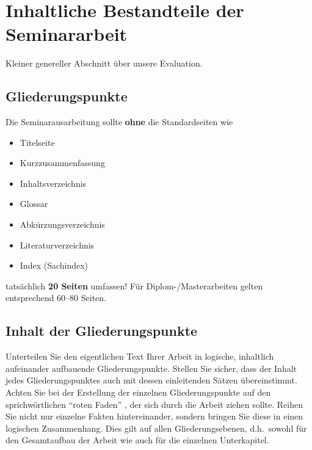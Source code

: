 %
\section{Inhaltliche Bestandteile der Seminararbeit}
\label{sec_inhalt}

Kleiner genereller Abschnitt über unsere Evaluation.




\subsection{Gliederungspunkte}

Die Seminarausarbeitung sollte {\bf ohne} die Standardseiten wie
\begin{itemize}
\item Titelseite
\item Kurzzusammenfassung
\item Inhaltsverzeichnis
\item Glossar
\item Abkürzungsverzeichnis
\item Literaturverzeichnis
\item Index (Sachindex)
\end{itemize}
tatsächlich {\bf 20 Seiten} umfassen!
Für Diplom-/Masterarbeiten gelten entsprechend 60--80 Seiten.

\subsection{Inhalt der Gliederungspunkte}
Unterteilen Sie den eigentlichen Text Ihrer Arbeit in logische, inhaltlich aufeinander aufbauende Gliederungspunkte.
Stellen Sie sicher, dass der Inhalt jedes Gliederungspunktes auch mit dessen einleitenden Sätzen übereinstimmt.
Achten Sie bei der Erstellung der einzelnen Gliederungspunkte auf den sprichwörtlichen "`roten Faden"' , der sich durch die Arbeit ziehen sollte.
Reihen Sie nicht nur einzelne Fakten hintereinander, sondern bringen Sie diese in einen logischen Zusammenhang.
Dies gilt auf allen Gliederungsebenen, d.h.~sowohl für den Gesamtaufbau der Arbeit wie auch für die einzelnen Unterkapitel.

